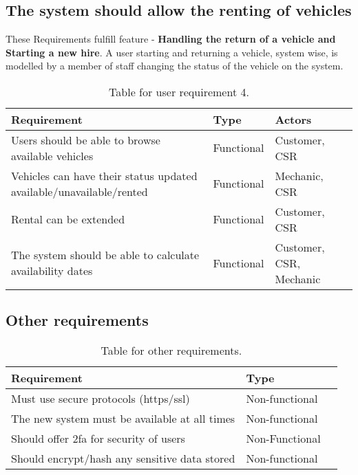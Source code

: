   \subsection{The system should allow the renting of vehicles}
  These Requirements fulfill feature - \textbf{Handling the return of a vehicle and Starting a new hire}. A user starting and returning a vehicle, system wise,
  is modelled by a member of staff changing the status of the vehicle on the system.
    \begin{table}[H]
      \centering
      \begin{tabular}{|p{}|p{}|p{}|}
        \hline
        Requirement & Type & Actors \\ \hline
        Users should be able to browse available vehicles & Functional & Customer, CSR \\ \hline
        Vehicles can have their status updated available/unavailable/rented & Functional & Mechanic, CSR \\ \hline
        Rental can be extended & Functional & Customer, CSR \\ \hline
        The system should be able to calculate availability dates & Functional & Customer, CSR, Mechanic \\ \hline
      \end{tabular}
      \caption{Table for user requirement 4.}
    \end{table}
  
  \subsection{Other requirements}
    \begin{table}[H]
      \centering
      \begin{tabular}{|p{}|p{}|p{}|}
        \hline
        Requirement & Type \\ \hline
        Must use secure protocols (https/ssl) & Non-functional \\ \hline
        The new system must be available at all times & Non-functional \\ \hline
        Should offer 2fa for security of users & Non-Functional \\ \hline
        Should encrypt/hash any sensitive data stored & Non-functional \\ \hline
      \end{tabular}
      \caption{Table for other requirements.}
    \end{table}

\newpage